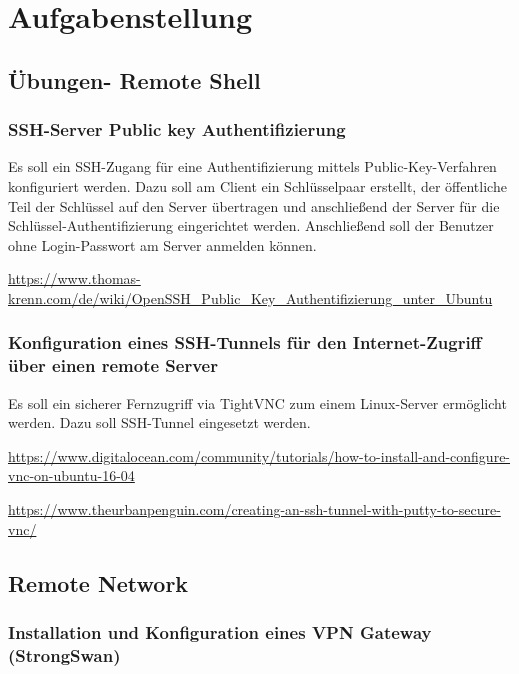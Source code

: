 \section{Aufgabenstellung}

\subsection{Übungen- Remote Shell}
\subsubsection{SSH-Server Public key Authentifizierung}
Es soll ein SSH-Zugang für eine Authentifizierung mittels Public-Key-Verfahren konfiguriert werden. Dazu soll am Client ein Schlüsselpaar erstellt, der öffentliche Teil der Schlüssel auf den Server übertragen und anschließend der Server für die Schlüssel-Authentifizierung eingerichtet werden. Anschließend soll der Benutzer ohne Login-Passwort am Server anmelden können.

\href{https://www.thomas-krenn.com/de/wiki/OpenSSH\_Public\_Key\_Authentifizierung\_unter\_Ubuntu}{https://www.thomas-krenn.com/de/wiki/OpenSSH\_Public\_Key\_Authentifizierung\_unter\_Ubuntu}

\subsubsection{Konfiguration eines SSH-Tunnels für den Internet-Zugriff über einen remote Server}
Es soll ein sicherer Fernzugriff via TightVNC zum einem Linux-Server ermöglicht werden. Dazu soll SSH-Tunnel eingesetzt werden.

\href{https://www.digitalocean.com/community/tutorials/how-to-install-and-configure-vnc-on-ubuntu-16-04}{https://www.digitalocean.com/community/tutorials/how-to-install-and-configure-vnc-on-ubuntu-16-04}

\href{https://www.theurbanpenguin.com/creating-an-ssh-tunnel-with-putty-to-secure-vnc/}{https://www.theurbanpenguin.com/creating-an-ssh-tunnel-with-putty-to-secure-vnc/}

\subsection{Remote Network}
\subsubsection{Installation und Konfiguration eines VPN Gateway (StrongSwan)}

